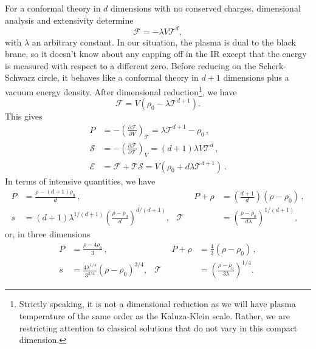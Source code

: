 \documentclass[12pt,a4paper]{article}
\newcommand{\prn}[1]{\left ( #1 \right )}
\newcommand{\pdiffc}[3][\rule{0mm}{0mm}]{\left (\frac{\partial #2}{\partial {#3}}\right )_{\!\!#1}}
\newcommand{\rz}{\rho_0}
\newcommand{\tloc}{\mathcal{T}}
\newcommand{\floc}{\mathcal{F}}
\newcommand{\eloc}{\mathcal{E}}
\newcommand{\sloc}{\mathcal{S}}
\begin{document}
For a conformal theory in $d$ dimensions with no conserved charges,
dimensional analysis and extensivity determine
%
\begin{equation}\label{freecnfrm:eq}
  \floc = -\lambda V \tloc^d,
\end{equation}
%
with $\lambda$ an arbitrary constant. In our situation, the plasma
is dual to the black brane, so it doesn't know about any capping off
in the IR except that the energy is measured with respect to a
different zero. Before reducing on the Scherk-Schwarz circle, it
behaves like a conformal theory in $d+1$ dimensions plus a vacuum
energy density. After dimensional reduction\footnote{Strictly
speaking, it is not a dimensional reduction as we will have plasma
temperature of the same order as the Kaluza-Klein scale. Rather, we
are restricting attention to classical solutions that do not vary in
this compact dimension.}, we have
%
\begin{equation}\label{freecnfng:eq}
  \floc = V\prn{\rz - \lambda \tloc^{d+1}}.
\end{equation}
%
This gives
%
\begin{equation}\label{therm:eq}
  \begin{split}
    P &= -\pdiffc[\tloc]{\floc}{V} = \lambda \tloc^{d+1} - \rz \,,\\
    \sloc &= -\pdiffc[V]{\floc}{\tloc} = (d+1)\lambda V \tloc^{d} \,,\\
    \eloc &= \floc+\tloc\sloc = V\prn{\rz + d\lambda \tloc^{d+1}}\,.
  \end{split}
\end{equation}
%
In terms of intensive quantities, we have
%
\begin{equation}\label{thermint:eq}
  \begin{aligned}
    P &= \frac{\rho-(d+1)\rz}{d} \,,&\qquad
    P+\rho &= \prn{\frac{d+1}{d}}(\rho-\rz) \,,\\
    s  &=
    (d+1)\lambda^{1/(d+1)}\prn{\frac{\rho-\rz}{d}}^{d/(d+1)},&
    \tloc &= \prn{\frac{\rho-\rz}{d\lambda}}^{1/(d+1)},
  \end{aligned}
\end{equation}
%
or, in three dimensions
\begin{equation}\label{therm3d:eq}
  \begin{aligned}
    P &= \frac{\rho-4\rz}{3} \,,&\qquad
    P+\rho &= \frac{4}{3}(\rho-\rz) \,,\\
    s  &=
    \frac{4\lambda^{1/4}}{3^{3/4}}\prn{\rho-\rz}^{3/4},&
    \tloc &= \prn{\frac{\rho-\rz}{3\lambda}}^{1/4}.
  \end{aligned}
\end{equation}
\end{document}
